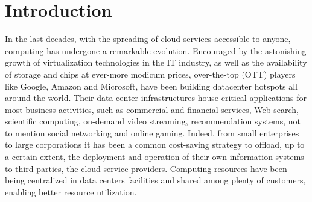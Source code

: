 \chapter*{Introduction}
In the last decades,  with the spreading of cloud services accessible to anyone, computing has undergone a remarkable evolution. Encouraged by the astonishing growth of virtualization technologies in the IT industry, as well as the availability of storage and chips at ever-more modicum prices, over-the-top (OTT) players like Google, Amazon and Microsoft, have been building datacenter hotspots all around the world. Their data center infrastructures house critical applications for most business activities, such as commercial and financial services, Web search, scientific computing, on-demand video streaming, recommendation systems, not to mention social networking and online gaming. Indeed, from small enterprises to large corporations it has been a common cost-saving strategy to offload, up to a certain extent, the deployment and operation of their own information systems to third parties, the cloud service providers. Computing resources have been being centralized in data centers facilities and shared among plenty of customers, enabling better resource utilization.

